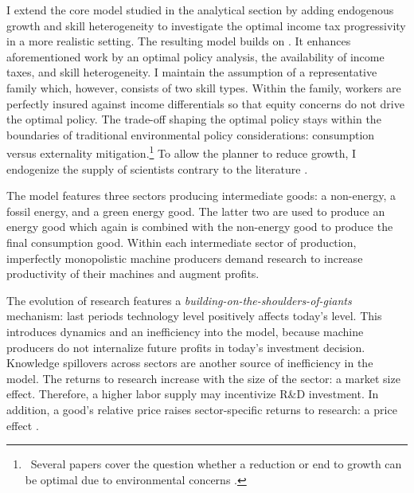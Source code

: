  I extend the core model studied in the analytical section by adding endogenous growth and skill heterogeneity to investigate the optimal income tax progressivity in a more realistic setting. The resulting model builds on \cite{Fried2018ClimateAnalysis}. It enhances aforementioned work by an optimal policy analysis, the availability of income taxes, and skill heterogeneity. 
I maintain the assumption of a representative family which, however, consists of two skill types. Within the family, workers are perfectly insured against income differentials so that equity concerns do not drive the optimal policy. The trade-off shaping the optimal policy stays within the boundaries of traditional environmental policy considerations: consumption versus externality mitigation.\footnote{\ Several papers cover the question whether a reduction or end to growth can be optimal due to environmental concerns \citep[for example,][]{Stokey1998AreGrowth, Acemoglu2012TheChange, Jones2016LifeGrowth}.}
To allow the planner to reduce growth, I endogenize the supply of scientists contrary to the literature \citep{Acemoglu2012TheChange, Fried2018ClimateAnalysis}. %

The model features three sectors producing intermediate goods:  a non-energy, a fossil energy, and a green energy good. The latter two are used to produce an energy good which again is combined with the non-energy good to produce the final consumption good.
Within each intermediate sector of production, imperfectly monopolistic machine producers demand research to increase productivity of their machines and augment profits. 

The evolution of research features a \textit{building-on-the-shoulders-of-giants} mechanism: last periods technology level positively affects today's level. This introduces dynamics and an inefficiency into the model, because machine producers do not internalize future profits in today's investment decision. 
Knowledge spillovers across sectors are another source of inefficiency in the model.
The returns to research increase with the size of the sector: a market size effect. Therefore, a higher labor supply may incentivize R\&D investment. In addition, a good's relative price raises sector-specific returns to research: a price effect \citep{Acemoglu2002DirectedChange}. 


